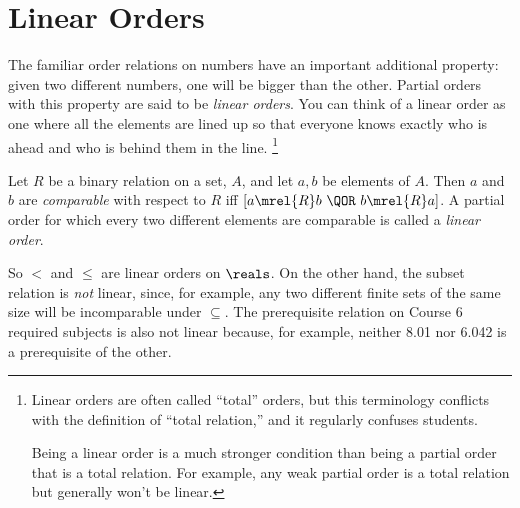 
\section{Linear Orders}

The familiar order relations on numbers have an important additional
property: given two different numbers, one will be bigger than the
other.  Partial orders with this property are said to be \emph{linear
  orders}.  You can think of a linear order as one where all the
elements are lined up so that everyone knows exactly who is ahead and
who is behind them in the line.
\footnote{Linear orders are often called ``total'' orders, but this
  terminology conflicts with the definition of ``total relation,'' and
  it regularly confuses students.

  Being a linear order is a much stronger condition than being a
  partial order that is a total relation.  For example, any weak
  partial order is a total relation but generally won't be linear.}

\begin{definition}\label{def:path_total}
Let $R$ be a binary relation on a set, $A$, and let $a, b$ be elements of
$A$.  Then $a$ and $b$ are \emph{comparable} with respect to $R$ iff $[a
  \mrel{R} b\ \QOR\ b \mrel{R} a]$.  A partial order for which every two
different elements are comparable is called a \emph{linear order}.
\end{definition}

So $<$ and $\le$ are linear orders on $\reals$.  On the other hand, the
subset relation is \emph{not} linear, since, for example, any two different
finite sets of the same size will be incomparable under $\subseteq$.  The
prerequisite relation on Course 6 required subjects is also not linear
because, for example, neither 8.01 nor 6.042 is a prerequisite of the
other.

\iffalse
The name linear is based on the following
\begin{lemma}\label{path_total_lem} For any
  finite, nonempty set of vertices from a linear order, there is
  a directed path going through exactly these vertices.  If
  the digraph is a DAG, the directed path is unique.
\end{lemma}
Lemma~\ref{path_total_lem} is easy to prove by induction on the size
of the set of vertices.  The proof is given in
Problem~\ref{CP_tournament_chain}.
\fi

